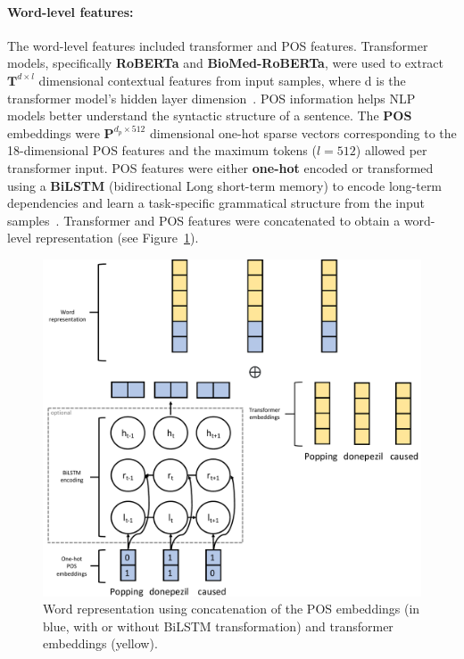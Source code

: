 \documentclass[11pt]{article}
\begin{document}
\paragraph{Word-level features: }
\label{par:word_features}
%
The word-level features included transformer and POS features.
Transformer models, specifically \textbf{RoBERTa} and \textbf{BioMed-RoBERTa}, were used to extract $\mathbf{T}^{d \times l}$ dimensional contextual features from input samples, where d is the transformer model's hidden layer dimension~\cite{liu2019roberta,gururangan2020don}.
POS information helps NLP models better understand the syntactic structure of a sentence.
The \textbf{POS} embeddings were $\mathbf{P}^{d_p \times 512}$ dimensional one-hot sparse vectors corresponding to the 18-dimensional POS features and the maximum tokens ($l = 512$) allowed per transformer input. 
POS features were either \textbf{one-hot} encoded or transformed using a \textbf{BiLSTM} (bidirectional Long short-term memory) to encode long-term dependencies and learn a task-specific grammatical structure from the input samples~\cite{hochreiter1997long}.
Transformer and POS features were concatenated to obtain a word-level representation (see Figure~\ref{fig:task2_word}).
\begin{figure}[!htbp]
    \centering
\includegraphics[width=0.95\columnwidth]{figures/word_arch.pdf}
    \caption{Word representation using concatenation of the POS embeddings (in blue, with or without BiLSTM transformation) and transformer embeddings (yellow).}
    \label{fig:task2_word}
\end{figure}
%
%
%
\end{document}
